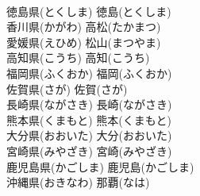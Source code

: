 \documentclass[8pt]{extreport}
\begin{document}
\begin{CJK}{UTF8}{min}
\\	徳島県(とくしま) 徳島(とくしま)
\\	香川県(かがわ) 高松(たかまつ)
\\	愛媛県(えひめ) 松山(まつやま)
\\	高知県(こうち) 高知(こうち)
\\	福岡県(ふくおか) 福岡(ふくおか)
\\	佐賀県(さが) 佐賀(さが)
\\	長崎県(ながさき) 長崎(ながさき)
\\	熊本県(くまもと) 熊本(くまもと)
\\	大分県(おおいた) 大分(おおいた)
\\	宮崎県(みやざき) 宮崎(みやざき)
\\	鹿児島県(かごしま) 鹿児島(かごしま)
\\	沖縄県(おきなわ) 那覇(なは)
\end{CJK}
\end{document}
